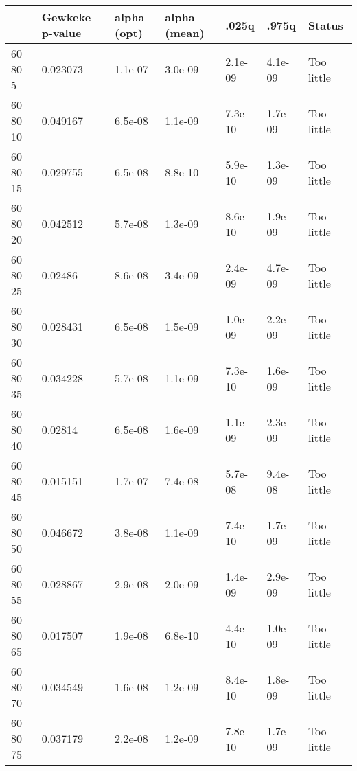 \begin{tabular}{lllllll}
& Gewkeke p-value & alpha (opt) & alpha (mean) & .025q & .975q & Status \\ 
\hline 
60  80   5 & 0.023073 & 1.1e-07 & 3.0e-09 & 2.1e-09 & 4.1e-09 & Too little \\ \hline 
60  80  10 & 0.049167 & 6.5e-08 & 1.1e-09 & 7.3e-10 & 1.7e-09 & Too little \\ \hline 
60  80  15 & 0.029755 & 6.5e-08 & 8.8e-10 & 5.9e-10 & 1.3e-09 & Too little \\ \hline 
60  80  20 & 0.042512 & 5.7e-08 & 1.3e-09 & 8.6e-10 & 1.9e-09 & Too little \\ \hline 
60  80  25 & 0.02486 & 8.6e-08 & 3.4e-09 & 2.4e-09 & 4.7e-09 & Too little \\ \hline 
60  80  30 & 0.028431 & 6.5e-08 & 1.5e-09 & 1.0e-09 & 2.2e-09 & Too little \\ \hline 
60  80  35 & 0.034228 & 5.7e-08 & 1.1e-09 & 7.3e-10 & 1.6e-09 & Too little \\ \hline 
60  80  40 & 0.02814 & 6.5e-08 & 1.6e-09 & 1.1e-09 & 2.3e-09 & Too little \\ \hline 
60  80  45 & 0.015151 & 1.7e-07 & 7.4e-08 & 5.7e-08 & 9.4e-08 & Too little \\ \hline 
60  80  50 & 0.046672 & 3.8e-08 & 1.1e-09 & 7.4e-10 & 1.7e-09 & Too little \\ \hline 
60  80  55 & 0.028867 & 2.9e-08 & 2.0e-09 & 1.4e-09 & 2.9e-09 & Too little \\ \hline 
60  80  65 & 0.017507 & 1.9e-08 & 6.8e-10 & 4.4e-10 & 1.0e-09 & Too little \\ \hline 
60  80  70 & 0.034549 & 1.6e-08 & 1.2e-09 & 8.4e-10 & 1.8e-09 & Too little \\ \hline 
60  80  75 & 0.037179 & 2.2e-08 & 1.2e-09 & 7.8e-10 & 1.7e-09 & Too little \\ \hline 
\hline 
\end{tabular}